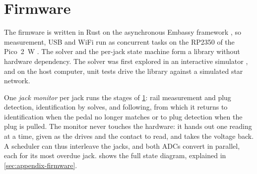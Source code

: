 
\section{Firmware}
\label{sec:firmware}

The firmware is written in Rust \cite{rust2026} on the asynchronous Embassy framework \cite{embassy2026}, so measurement, USB and WiFi run as concurrent tasks on the RP2350 of the Pico~2~W \cite{rpi2026rp2350, benson2026expad}. The solver and the per-jack state machine form a library without hardware dependency. The solver was first explored in an interactive simulator \cite{benson2026topologysim}, and on the host computer, unit tests drive the library against a simulated star network.

One \emph{jack monitor} per jack runs the stages of \cref{fig:firmware-overview}: rail measurement and plug detection, identification by solves, and following, from which it returns to identification when the pedal no longer matches or to plug detection when the plug is pulled. The monitor never touches the hardware: it hands out one reading at a time, given as the drives and the contact to read, and takes the voltage back. A scheduler can thus interleave the jacks, and both ADCs convert in parallel, each for its most overdue jack.  shows the full state diagram, explained in \cref{sec:appendix-firmware}.

\begin{figure}[tb]
  \centering
  
  \label{fig:firmware-overview}
\end{figure}

